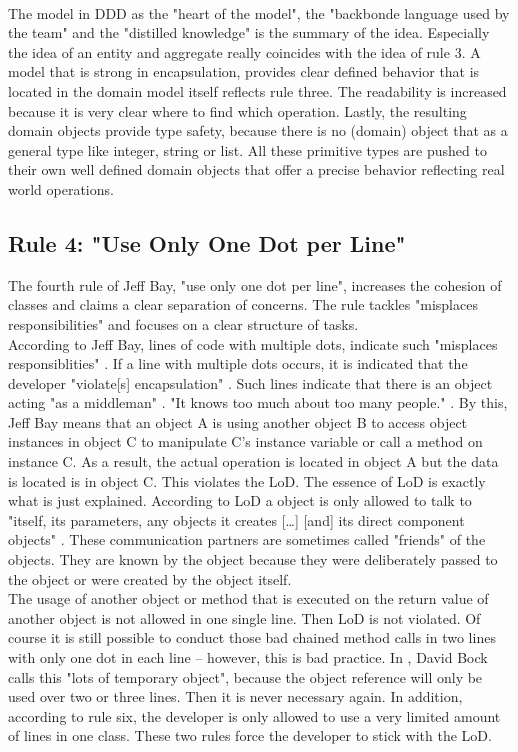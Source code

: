 \\
The model in \ac{DDD} as the "heart of the model", the "backbonde language used by the team" and the "distilled knowledge" \cite[p. 25]{dddbook} is the summary of the idea. Especially the idea of an entity and aggregate really coincides with the idea of rule 3. A model that is strong in encapsulation, provides clear defined behavior that is located in the domain model itself reflects rule three. The readability is increased because it is very clear where to find which operation. Lastly, the resulting domain objects provide type safety, because there is no (domain) object that as a general type like integer, string or list. All these primitive types are pushed to their own well defined domain objects that offer a precise behavior reflecting real world operations. 

\subsection*{Rule 4: "Use Only One Dot per Line"}
The fourth rule of Jeff Bay, "use only one dot per line", increases the cohesion of classes and claims a clear separation of concerns. The rule tackles "misplaces responsibilities" \cite{oc2008} and focuses on a clear structure of tasks.\\

According to Jeff Bay, lines of code with multiple dots, indicate such "misplaces responsiblities" \cite{oc2008}. If a line with multiple dots occurs, it is indicated that the developer "violate[s] encapsulation" \cite{oc2008}. Such lines indicate that there is an object acting "as a middleman" \cite{oc2008}. "It knows too much about too many people." \cite{oc2008}. By this, Jeff Bay means that an object A is using another object B to access object instances in object C to manipulate C's instance variable or call a method on instance C. As a result, the actual operation is located in object A but the data is located is in object C. This violates the \ac{LoD}. The essence of \ac{LoD} is exactly what is just explained. According to \ac{LoD} a object is only allowed to talk to "itself, its parameters, any objects it creates [\dots] [and] its direct component objects" \cite{ba.com}. These communication partners are sometimes called "friends" of the objects. They are known by the object because they were deliberately passed to the object or were created by the object itself.  
\\

The usage of another object or method that is executed on the return value of another object is not allowed in one single line. Then \ac{LoD} is not violated. Of course it is still possible to conduct those bad chained method calls in two lines with only one dot in each line -- however, this is bad practice. In \cite{paperboy}, David Bock calls this "lots of temporary object", because the object reference will only be used over two or three lines. Then it is never necessary again. In addition, according to rule six, the developer is only allowed to use a very limited amount of lines in one class. These two rules force the developer to stick with the \ac{LoD}.
\\

